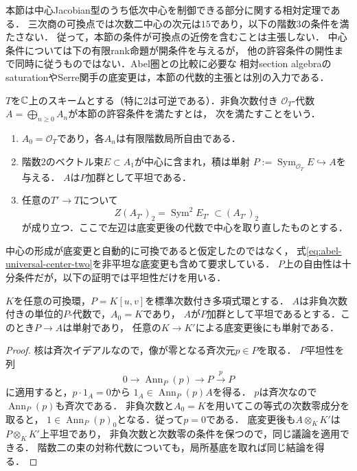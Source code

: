 本節は中心Jacobian型のうち低次中心を制御できる部分に関する相対定理である．
三次商の可換点では次数二中心の次元は$15$であり，以下の階数$3$の条件を満たさない．
従って，本節の条件が可換点の近傍を含むことは主張しない．
中心条件については下の有限rank命題が開条件を与えるが，
他の許容条件の開性まで同時に従うものではない．Abel圏との比較に必要な
相対section algebraのsaturationやSerre関手の底変更は，本節の代数的主張とは別の入力である．

\begin{definition}[普遍的な中心二変数条件]
\label{def:abel-two-center-family}
$T$を$\mathbb C$上のスキームとする（特に$2$は可逆である）．非負次数付き
$\mathcal O_T$-代数$A=\bigoplus_{n\geq0}A_n$が本節の許容条件を満たすとは，
次を満たすことをいう．
\begin{enumerate}
\item $A_0=\mathcal O_T$であり，各$A_n$は有限階数局所自由である．
\item 階数$2$のベクトル束$E\subset A_1$が中心に含まれ，積は単射
  $P:=\operatorname{Sym}_{\mathcal O_T}E\hookrightarrow A$を与える．
  $A$は$P$加群として平坦である．
\item 任意の$T'\to T$について
  \begin{equation}\label{eq:abel-universal-center-two}
    Z(A_{T'})_2=\operatorname{Sym}^2 E_{T'}
       \ \subset (A_{T'})_2
  \end{equation}
  が成り立つ．ここで左辺は底変更後の代数で中心を取り直したものとする．
\end{enumerate}
中心の形成が底変更と自動的に可換であると仮定したのではなく，
式\eqref{eq:abel-universal-center-two}を非平坦な底変更も含めて要求している．
$P$上の自由性は十分条件だが，以下の証明では平坦性だけを用いる．
\end{definition}

\begin{lemma}[中心多項式環の埋込みは普遍的である]
\label{lem:abel-universal-polynomial-embedding}
$K$を任意の可換環，$P=K[u,v]$を標準次数付き多項式環とする．
$A$は非負次数付きの単位的$P$-代数で，$A_0=K$であり，
$A$が$P$加群として平坦であるとする．このとき$P\to A$は単射であり，
任意の$K\to K'$による底変更後にも単射である．
\end{lemma}
\begin{proof}
核は斉次イデアルなので，像が零となる斉次元$p\in P$を取る．
$P$平坦性を列
\[
 0\longrightarrow\operatorname{Ann}_P(p)\longrightarrow P
          \xrightarrow{p}P
\]
に適用すると，$p\cdot1_A=0$から
$1_A\in\operatorname{Ann}_P(p)A$を得る．
$p$は斉次なので$\operatorname{Ann}_P(p)$も斉次である．
非負次数と$A_0=K$を用いてこの等式の次数零成分を取ると，
$1\in\operatorname{Ann}_P(p)_0$となる．従って$p=0$である．
底変更後も$A\otimes_KK'$は$P\otimes_KK'$上平坦であり，
非負次数と次数零の条件を保つので，同じ議論を適用できる．
階数二の束の対称代数についても，局所基底を取れば同じ結論を得る．
\end{proof}

